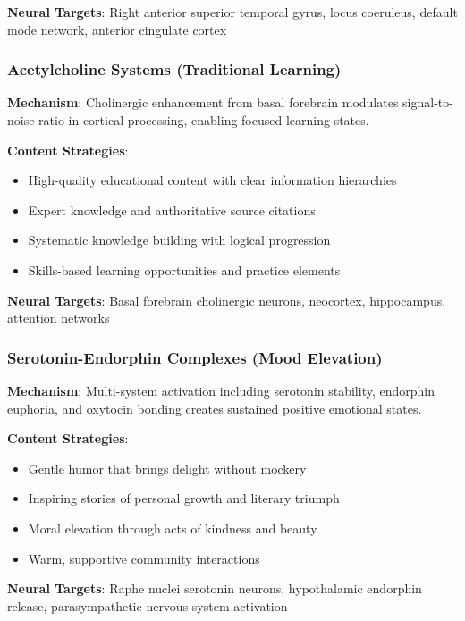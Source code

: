 \documentclass[11pt,letterpaper]{article}
\begin{document}
\textbf{Neural Targets}: Right anterior superior temporal gyrus, locus coeruleus, default mode network, anterior cingulate cortex

\subsubsection{Acetylcholine Systems (Traditional Learning)}

\textbf{Mechanism}: Cholinergic enhancement from basal forebrain modulates signal-to-noise ratio in cortical processing, enabling focused learning states.

\textbf{Content Strategies}:
\begin{itemize}
    \item High-quality educational content with clear information hierarchies
    \item Expert knowledge and authoritative source citations
    \item Systematic knowledge building with logical progression
    \item Skills-based learning opportunities and practice elements
\end{itemize}

\textbf{Neural Targets}: Basal forebrain cholinergic neurons, neocortex, hippocampus, attention networks

\subsubsection{Serotonin-Endorphin Complexes (Mood Elevation)}

\textbf{Mechanism}: Multi-system activation including serotonin stability, endorphin euphoria, and oxytocin bonding creates sustained positive emotional states.

\textbf{Content Strategies}:
\begin{itemize}
    \item Gentle humor that brings delight without mockery
    \item Inspiring stories of personal growth and literary triumph
    \item Moral elevation through acts of kindness and beauty
    \item Warm, supportive community interactions
\end{itemize}

\textbf{Neural Targets}: Raphe nuclei serotonin neurons, hypothalamic endorphin release, parasympathetic nervous system activation
\end{document}
